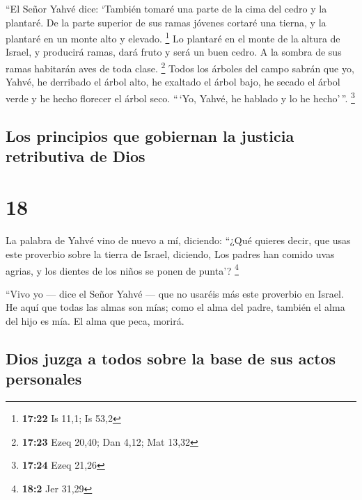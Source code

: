  ``El Señor Yahvé dice: `También tomaré una parte de la
cima del cedro y la plantaré. De la parte superior de sus ramas jóvenes
cortaré una tierna, y la plantaré en un monte alto y elevado.
\footnote{\textbf{17:22} Is 11,1; Is 53,2}  Lo plantaré
en el monte de la altura de Israel, y producirá ramas, dará fruto y será
un buen cedro. A la sombra de sus ramas habitarán aves de toda clase.
\footnote{\textbf{17:23} Ezeq 20,40; Dan 4,12; Mat 13,32}
 Todos los árboles del campo sabrán que yo, Yahvé, he
derribado el árbol alto, he exaltado el árbol bajo, he secado el árbol
verde y he hecho florecer el árbol seco. ``\,`Yo, Yahvé, he hablado y lo
he hecho'\,''. \footnote{\textbf{17:24} Ezeq 21,26}

\hypertarget{los-principios-que-gobiernan-la-justicia-retributiva-de-dios}{%
\subsection{Los principios que gobiernan la justicia retributiva de
Dios}\label{los-principios-que-gobiernan-la-justicia-retributiva-de-dios}}

\hypertarget{section-17}{%
\section{18}\label{section-17}}

 La palabra de Yahvé vino de nuevo a mí, diciendo:
 ``¿Qué quieres decir, que usas este proverbio sobre la
tierra de Israel, diciendo, Los padres han comido uvas agrias, y los
dientes de los niños se ponen de punta'? \footnote{\textbf{18:2} Jer
  31,29}

 ``Vivo yo --- dice el Señor Yahvé --- que no usaréis más
este proverbio en Israel.  He aquí que todas las almas son
mías; como el alma del padre, también el alma del hijo es mía. El alma
que peca, morirá.

\hypertarget{dios-juzga-a-todos-sobre-la-base-de-sus-actos-personales}{%
\subsection{Dios juzga a todos sobre la base de sus actos
personales}\label{dios-juzga-a-todos-sobre-la-base-de-sus-actos-personales}}

